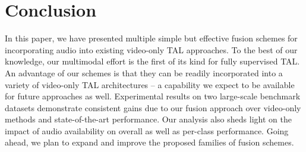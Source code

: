 \documentclass[10pt,twocolumn,letterpaper]{article}
\begin{document}
\section{Conclusion}

In this paper, we have presented multiple simple but effective fusion schemes for incorporating audio into existing video-only TAL approaches. To the best of our knowledge, our multimodal effort is the first of its kind for fully supervised TAL. An advantage of our schemes is that they can be readily incorporated into a variety of video-only TAL architectures -- a capability we expect to be available for future approaches as well. Experimental results on two large-scale benchmark datasets demonstrate consistent gains due to our fusion approach over video-only methods and state-of-the-art performance. Our analysis also sheds light on the impact of audio availability on overall as well as per-class performance. Going ahead, we plan to expand and improve the proposed families of fusion schemes.


{\small


}
\end{document}
